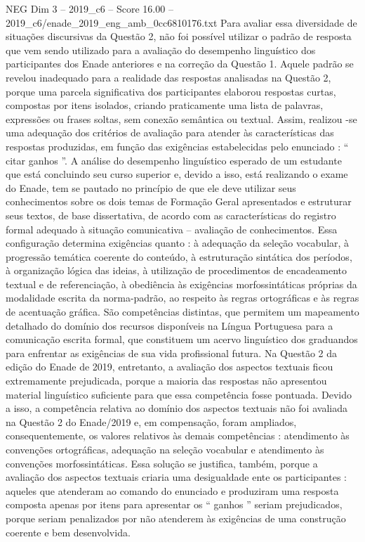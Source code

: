 \begin{textsample}{NEG Dim 3 – 2019\_c6 – Score 16.00 – 2019\_c6/enade\_2019\_eng\_amb\_0cc6810176.txt}
Para avaliar essa diversidade de situações discursivas da Questão 2, não foi possível utilizar o padrão de resposta que vem sendo utilizado para a avaliação do desempenho linguístico dos participantes dos Enade anteriores e na correção da Questão 1.
Aquele padrão se revelou inadequado para a realidade das respostas analisadas na Questão 2, porque uma parcela significativa dos participantes elaborou respostas curtas, compostas por itens isolados, criando praticamente uma lista de palavras, expressões ou frases soltas, sem conexão semântica ou textual.
Assim, realizou -se uma adequação dos critérios de avaliação para atender às características das respostas produzidas, em função das exigências estabelecidas pelo enunciado : “ citar ganhos ”.
A análise do desempenho linguístico esperado de um estudante que está concluindo seu curso superior e, devido a isso, está realizando o exame do Enade, tem se pautado no princípio de que ele deve utilizar seus conhecimentos sobre os dois temas de Formação Geral apresentados e estruturar seus textos, de base dissertativa, de acordo com as características do registro formal adequado à situação comunicativa – avaliação de conhecimentos.
Essa configuração determina exigências quanto : à adequação da seleção vocabular, à progressão temática coerente do conteúdo, à estruturação sintática dos períodos, à organização lógica das ideias, à utilização de procedimentos de encadeamento textual e de referenciação, à obediência às exigências morfossintáticas próprias da modalidade escrita da norma-padrão, ao respeito às regras ortográficas e às regras de acentuação gráfica.
São competências distintas, que permitem um mapeamento detalhado do domínio dos recursos disponíveis na Língua Portuguesa para a comunicação escrita formal, que constituem um acervo linguístico dos graduandos para enfrentar as exigências de sua vida profissional futura.
Na Questão 2 da edição do Enade de 2019, entretanto, a avaliação dos aspectos textuais ficou extremamente prejudicada, porque a maioria das respostas não apresentou material linguístico suficiente para que essa competência fosse pontuada.
Devido a isso, a competência relativa ao domínio dos aspectos textuais não foi avaliada na Questão 2 do Enade/2019 e, em compensação, foram ampliados, consequentemente, os valores relativos às demais competências : atendimento às convenções ortográficas, adequação na seleção vocabular e atendimento às convenções morfossintáticas.
Essa solução se justifica, também, porque a avaliação dos aspectos textuais criaria uma desigualdade ente os participantes : aqueles que atenderam ao comando do enunciado e produziram uma resposta composta apenas por itens para apresentar os “ ganhos ” seriam prejudicados, porque seriam penalizados por não atenderem às exigências de uma construção coerente e bem desenvolvida.

\end{textsample}
